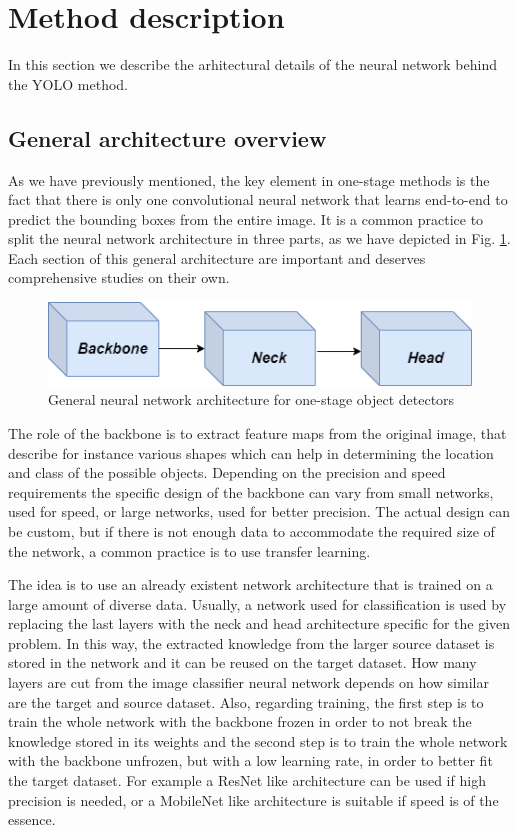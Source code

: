 \section{Method description} \label{method}

In this section we describe the arhitectural details of the neural network behind the YOLO method. 

\subsection{General architecture overview}

As we have previously mentioned, the key element in one-stage methods is the fact that there is only one convolutional neural network that learns end-to-end to predict the bounding boxes from the entire image. It is a common practice to split the neural network architecture in three parts, as we have depicted in Fig. \ref{architecture}. Each section of this general architecture are important and deserves comprehensive studies on their own.

\begin{figure}[!h]
  \centering
  \includegraphics[scale=0.5]{images/objdet_structure.png}
  \caption{General neural network architecture for one-stage object detectors}
      \label{architecture}
\end{figure} 

The role of the backbone is to extract feature maps from the original image, that describe for instance various shapes which can help in determining the location and class of the possible objects. Depending on the precision and speed requirements the specific design of the backbone can vary from small networks, used for speed, or large networks, used for better precision. The actual design can be custom, but if there is not enough data to accommodate the required size of the network, a common practice is to use transfer learning. 

The idea is to use an already existent network architecture that is trained on a large amount of diverse data. Usually, a network used for classification is used by replacing the last layers with the neck and head architecture specific for the given problem. In this way, the extracted knowledge from the larger source dataset is stored in the network and it can be reused on the target dataset. How many layers are cut from the image classifier neural network depends on how similar are the target and source dataset. Also, regarding training, the first step is to train the whole network with the backbone frozen in order to not break the knowledge stored in its weights and the second step is to train the whole network with the backbone unfrozen, but with a low learning rate, in order to better fit the target dataset. For example a ResNet like architecture \cite{resnet} can be used if high precision is needed, or a MobileNet like architecture \cite{mobilenetv1, mobilenetv2} is suitable if speed is of the essence.

